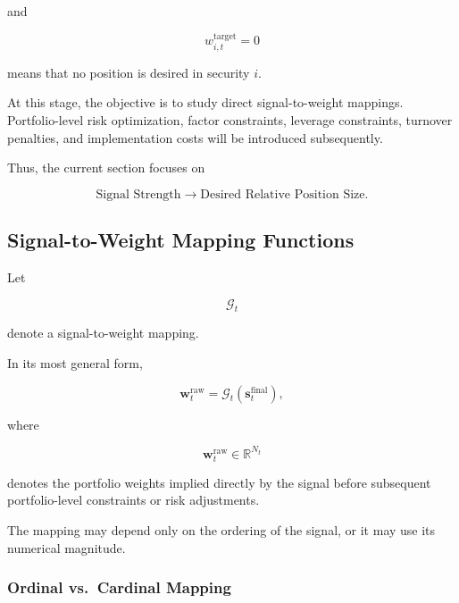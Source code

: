 \documentclass[11pt,a4paper]{article}
\begin{document}
and

\begin{equation}
w_{i,t}^{\mathrm{target}}=0
\end{equation}

means that no position is desired in security $i$.

At this stage, the objective is to study direct signal-to-weight mappings.
Portfolio-level risk optimization, factor constraints, leverage constraints,
turnover penalties, and implementation costs will be introduced subsequently.

Thus, the current section focuses on

\begin{equation}
\boxed{
\text{Signal Strength}
\rightarrow
\text{Desired Relative Position Size}.
}
\end{equation}


\subsection{Signal-to-Weight Mapping Functions}
\label{subsec:signal_weight_mapping}

Let

\begin{equation}
\mathcal{G}_t
\end{equation}

denote a signal-to-weight mapping.

In its most general form,

\begin{equation}
\boxed{
\mathbf{w}_t^{\mathrm{raw}}
=
\mathcal{G}_t
\left(
\mathbf{s}_t^{\mathrm{final}}
\right),
}
\end{equation}

where

\begin{equation}
\mathbf{w}_t^{\mathrm{raw}}
\in
\mathbb{R}^{N_t}
\end{equation}

denotes the portfolio weights implied directly by the signal before subsequent
portfolio-level constraints or risk adjustments.

The mapping may depend only on the ordering of the signal, or it may use its
numerical magnitude.


\subsubsection{Ordinal vs.\ Cardinal Mapping}
\end{document}
